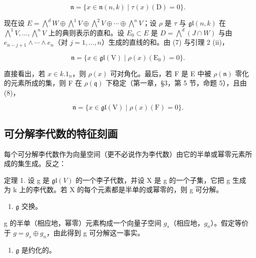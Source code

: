 \[
\mathfrak {n} = \{x \in \mathfrak {n} (n, k) \mid \tau (x) (\mathrm{D}) = 0 \}.\tag{7}
\]

现在设 \(E = \bigwedge^{d} W \oplus \bigwedge^{1} V \oplus \bigwedge^{2} V \oplus \cdots \oplus \bigwedge^{n} V\)；设 \(\rho\) 是 \(\tau\) 与 \(\mathfrak{gl}(n, k)\) 在 \(\bigwedge^{1} V, \ldots, \bigwedge^{n} V\) 上的典则表示的直和。设 \(E_{0} \subset E\) 是 \(D = \bigwedge^{d} (J \cap W)\) 与由 \(e_{n-j+1} \wedge \cdots \wedge e_{n}\)（对 \(j = 1, \ldots, n\)）生成的直线的和。由 (7) 与引理 2 (ii)，

\[
\mathfrak {n} = \{x \in \mathfrak {g l} (\mathrm{V}) \mid \rho (x) (\mathrm{E} _ {0}) = 0 \}.\tag{8}
\]

直接看出，若 \(x \in k.1_{n}\)，则 \(\rho(x)\) 可对角化。最后，若 F 是 E 中被 \(\rho(\mathfrak{n})\) 零化的元素所成的集，则 F 在 \(\rho(\mathfrak{q})\) 下稳定（第一章，§3，第 5 节，命题 5），且由 (8)，

\[
\mathfrak {n} = \{x \in \mathfrak {g l} (\mathrm{V}) \mid \rho (x) (\mathrm{F}) = 0 \}.\tag{9}
\]

\subsection{可分解李代数的特征刻画}

每个可分解李代数作为向量空间（更不必说作为李代数）由它的半单或幂零元素所成的集生成。反之：

定理 1. 设 g 是 \(\mathfrak{gl}(V)\) 的一个李子代数，并设 X 是 g 的一个子集，它把 g 生成为 k 上的李代数。若 X 的每个元素都是半单的或幂零的，则 g 可分解。

\begin{enumerate}
\def\labelenumi{\alph{enumi})}
\tightlist
\item
  \(\mathfrak{g}\) 交换。
\end{enumerate}

g 的半单（相应地，幂零）元素构成一个向量子空间 \(g_{s}\)（相应地，\(g_{n}\)）。假定等价于 \(g = g_{s} \oplus g_{n}\)，由此得到 g 可分解这一事实。

\begin{enumerate}
\def\labelenumi{\alph{enumi})}
\setcounter{enumi}{1}
\tightlist
\item
  \(\mathfrak{g}\) 是约化的。
\end{enumerate}

